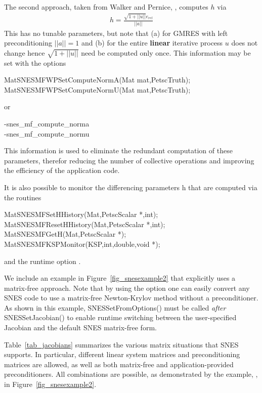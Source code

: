 The second approach, taken from Walker and Pernice, \cite{pw98}, computes $ h $ via
\begin{eqnarray*}
        h = \frac{\sqrt{1 + ||u||}e_{rel}}{||a||}
\end{eqnarray*}
This has no tunable parameters, but note that (a) for GMRES with left preconditioning
$ ||a|| = 1 $ and (b) for the entire {\bf linear} iterative process $ u $ does not change hence
$\sqrt{1 + ||u||} $ need be computed only once. This information may be set with the 
options
\begin{tabbing}
  MatSNESMFWPSetComputeNormA(Mat mat,PetscTruth);\\
  MatSNESMFWPSetComputeNormU(Mat mat,PetscTruth);
\end{tabbing}
or 
\begin{tabbing}
   -snes\_mf\_compute\_norma\\
   -snes\_mf\_compute\_normu 
\end{tabbing}
This information is used to eliminate the redundant computation of these parameters,
therefor reducing the number of collective operations and improving the efficiency of the 
application code.

It is also possible to monitor the differencing parameters h that are computed
via the routines
\begin{tabbing}
   MatSNESMFSetHHistory(Mat,PetscScalar *,int);\\
   MatSNESMFResetHHistory(Mat,PetscScalar *,int);\\
   MatSNESMFGetH(Mat,PetscScalar *);\\
   MatSNESMFKSPMonitor(KSP,int,double,void *);
\end{tabbing}
and the runtime option  . 

We include an example in Figure~\ref{fig_snesexample2} that explicitly
uses a matrix-free approach.  Note that by using the option 
 one can easily convert any SNES code to use a matrix-free
Newton-Krylov method without a preconditioner.  As shown in this
example, SNESSetFromOptions() must be called {\em after}
SNESSetJacobian() to enable runtime switching between the
user-specified Jacobian and the default SNES matrix-free form.

Table~\ref{tab_jacobians} summarizes the various matrix situations
that SNES supports.  In particular, different linear system matrices
and preconditioning matrices are allowed, as well as both matrix-free
and application-provided preconditioners.  All combinations are
possible, as demonstrated by the example, 
,
 in Figure~\ref{fig_snesexample2}.

